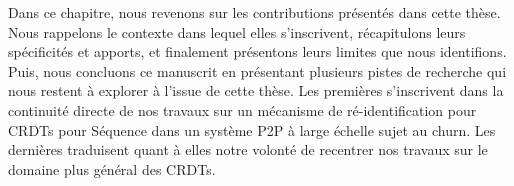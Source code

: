 Dans ce chapitre, nous revenons sur les contributions présentés dans cette thèse.
Nous rappelons le contexte dans lequel elles s'inscrivent, récapitulons leurs spécificités et apports, et finalement présentons leurs limites que nous identifions.
Puis, nous concluons ce manuscrit en présentant plusieurs pistes de recherche qui nous restent à explorer à l'issue de cette thèse.
Les premières s'inscrivent dans la continuité directe de nos travaux sur un mécanisme de ré-identification pour \acp{CRDT} pour Séquence dans un système \ac{P2P} à large échelle sujet au churn.
Les dernières traduisent quant à elles notre volonté de recentrer nos travaux sur le domaine plus général des \acp{CRDT}.
